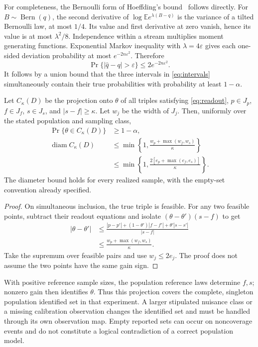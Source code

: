 \documentclass[11pt,a4paper]{article}
\newcommand{\diam}{\operatorname{diam}}
\newcommand{\Bern}{\operatorname{Bern}}
\begin{document}
For completeness, the Bernoulli form of Hoeffding's bound~\cite{hoeffding} follows directly. For $B\sim\Bern(q)$, the second derivative of
$\log\mathbb E e^{\lambda(B-q)}$ is the variance of a tilted Bernoulli law, at most $1/4$. Its value and first derivative at zero vanish, hence its value is at most $\lambda^2/8$. Independence within a stream multiplies moment generating functions. Exponential Markov inequality with $\lambda=4\varepsilon$ gives each one-sided deviation probability at most $e^{-2n\varepsilon^2}$. Therefore
\[
 \Pr\{|\widehat q-q|>\varepsilon\}\le2e^{-2n\varepsilon^2}.
\]
It follows by a union bound that the three intervals in \eqref{eq:intervals} simultaneously contain their true probabilities with probability at least $1-\alpha$.

\begin{theorem}
Let $C_\kappa(D)$ be the projection onto $\theta$ of all triples satisfying \eqref{eq:readout}, $p\in J_p$, $f\in J_f$, $s\in J_s$, and $|s-f|\ge\kappa$. Let $w_j$ be the width of $J_j$. Then, uniformly over the stated population and sampling class,
\begin{align}
 \Pr\{\theta\in C_\kappa(D)\}&\ge1-\alpha,\label{eq:positivecoverage}\\
 \diam C_\kappa(D)&\le
 \min\left\{1,\frac{w_p+\max(w_f,w_s)}{\kappa}\right\}\label{eq:widthbound}\\
 &\le\min\left\{1,\frac{2[e_p+\max(e_f,e_s)]}{\kappa}\right\}.
 \nonumber
\end{align}
The diameter bound holds for every realized sample, with the empty-set convention already specified.
\end{theorem}
\begin{proof}
On simultaneous inclusion, the true triple is feasible. For any two feasible points, subtract their readout equations and isolate $(\theta-\theta')(s-f)$ to get
\begin{align*}
 |\theta-\theta'|
 &\le\frac{|p-p'|+(1-\theta')|f-f'|+\theta'|s-s'|}{|s-f|}\\
 &\le\frac{w_p+\max(w_f,w_s)}{\kappa}.
\end{align*}
Take the supremum over feasible pairs and use $w_j\le2e_j$. The proof does not assume the two points have the same gain sign.
\end{proof}

With positive reference sample sizes, the population reference laws determine $f,s$; nonzero gain then identifies $\theta$. Thus this projection covers the complete, singleton population identified set in that experiment. A larger stipulated nuisance class or a missing calibration observation changes the identified set and must be handled through its own observation map. Empty reported sets can occur on noncoverage events and do not constitute a logical contradiction of a correct population model.
\end{document}
